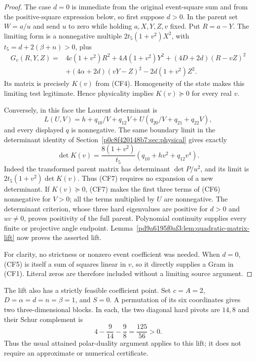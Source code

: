\begin{proof}
The case $d=0$ is immediate from the original event-square sum and
from the positive-square expression below, so first suppose $d>0$.
In the parent set $W=a/u$ and send $u$ to zero while holding
$a,X,Y,Z,v$ fixed. Put $R=a-Y$. The limiting form is a nonnegative
multiple $2t_5(1+v^2)X^2$, with
$t_5=d+2(\beta+n)>0$, plus
\[
 \begin{split}
 G_v(R,Y,Z)={}&4c(1+v^2)R^2+4A(1+v^2)Y^2
                  +(4D+2d)(R-vZ)^2\\
 &+(4\alpha+2d)(vY-Z)^2-2d(1+v^2)Z^2.
 \end{split}                                             \tag{CF5}
\]
Its matrix is precisely $K(v)$ from (CF4). Homogeneity of the state
makes this limiting test legitimate. Hence physicality implies
$K(v)\succeq0$ for every real $v$.

Conversely, in this face the Laurent determinant is
\[
 L(U,V)=h+q_{10}/V+q_{12}V
                   +U(q_{20}/V+q_{21}+q_{22}V),             \tag{CF6}
\]
and every displayed $q$ is nonnegative. The same boundary limit in
the determinant identity of Section~\ref{p0c8f420148b7:sec:physical} gives exactly
\[
 \det K(v)=\frac{8(1+v^2)}{t_5}
                (q_{10}+hv^2+q_{12}v^4).                  \tag{CF7}
\]
Indeed the transformed parent matrix has determinant
$\det P/u^2$, and its limit is
$2t_5(1+v^2)\det K(v)$. Thus (CF7) requires no expansion of a
new determinant. If $K(v)\succeq0$, (CF7) makes the first three
terms of (CF6) nonnegative for $V>0$; all the terms multiplied by
$U$ are nonnegative. The determinant criterion, whose three hard
eigenvalues are positive for $d>0$ and $uv\ne0$, proves positivity
of the full parent. Polynomial continuity supplies every finite or
projective angle endpoint. Lemma~\ref{pd9a6195f0af3:lem:quadratic-matrix-lift}
now proves the asserted lift.

For clarity, no strictness or nonzero event coefficient was needed.
When $d=0$, (CF5) is itself a sum of squares linear in $v$, so it
directly supplies a Gram in (CF1). Literal zeros are therefore
included without a limiting source argument.
\end{proof}

The lift also has a strictly feasible coefficient point. Set
$c=A=2$, $D=\alpha=d=n=\beta=1$, and $S=0$. A permutation of
its six coordinates gives two three-dimensional blocks. In each,
the two diagonal hard pivots are $14,8$ and their Schur complement
is
\[
 4-\frac9{14}-\frac98=\frac{125}{56}>0.                    \tag{CF8}
\]
Thus the usual attained polar-duality argument applies to this lift;
it does not require an approximate or numerical certificate.

